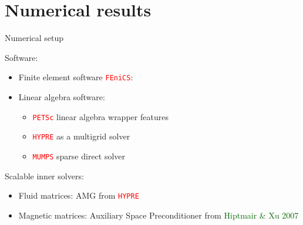 \documentclass[12pt]{beamer}
\newcommand{\gr}[1]{\textcolor{darkgreen} {#1}}
\newcommand{\re}[1]{{\textcolor{red}       {#1}}}
\begin{document}
\section{Numerical results}

\begin{frame}{Numerical setup}

{\large Software:}
\begin{itemize}
  \item Finite element software \re{\tt FEniCS}:
  \item Linear algebra software:
  \begin{itemize}
    \item \re{\tt PETSc} linear algebra wrapper features
    \item \re{\tt HYPRE} as a multigrid solver
    \item \re{\tt MUMPS} sparse direct solver
  \end{itemize}
\end{itemize}

\vspace{3mm}

{\large Scalable inner solvers:}
  \begin{itemize}
    \item Fluid matrices: AMG from \re{\tt HYPRE}
    \item Magnetic matrices: Auxiliary Space Preconditioner from \gr{Hiptmair \& Xu 2007}
  \end{itemize}




\end{frame}
\end{document}
